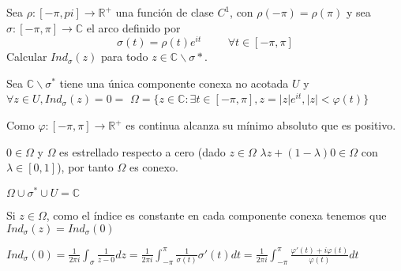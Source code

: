\begin{ejer}
	Sea $\rho : [-\pi,pi]\rightarrow\mathbb{R}^+$ una función de clase $C^1$, con $\rho(-\pi) = \rho(\pi)$ y sea $\sigma :[-\pi,\pi] \rightarrow\mathbb{C}$ el arco definido por
	$$ \sigma(t) = \rho(t)e^{it} \hspace{1cm} \forall t\in [-\pi,\pi] $$
	Calcular $Ind_{\sigma}(z)$ para todo $z\in\mathbb{C}\backslash\sigma{\ast}$.
\end{ejer}
\begin{sol}

Sea $\mathbb{C}\backslash\sigma^{\ast}$ tiene una única componente conexa no acotada $U$ y $\forall z\in U, Ind_{\sigma}(z)=0=$
$\Omega = \{ z\in\mathbb{C} : \exists t\in[-\pi,\pi], z=|z|e^{it}, |z|<\varphi(t) \}$

Como $\varphi : [-\pi,\pi] \rightarrow \mathbb{R}^+$ es continua alcanza su mínimo absoluto que es positivo.

$0\in\Omega$ y $\Omega$ es estrellado respecto a cero
(dado $z\in\Omega$ $\lambda z + (1-\lambda)0 \in\Omega$ con $\lambda\in[0,1]$), por tanto $\Omega$ es conexo.

$\Omega \cup \sigma^{\ast} \cup U = \mathbb{C}$

Si $z\in\Omega$, como el índice es constante en cada componente conexa tenemos que $Ind_{\sigma}(z) = Ind_{\sigma}(0)$

$Ind_{\sigma}(0) = \frac{1}{2\pi i} \int_{\sigma} \frac{1}{z-0}dz = \frac{1}{2\pi i} \int_{-\pi}^{\pi} \frac{1}{\sigma(t)} \sigma'(t)dt = \frac{1}{2\pi i} \int_{-\pi}^{\pi} \frac{\varphi'(t)+i\varphi(t)}{\varphi(t)} dt$

\end{sol}



